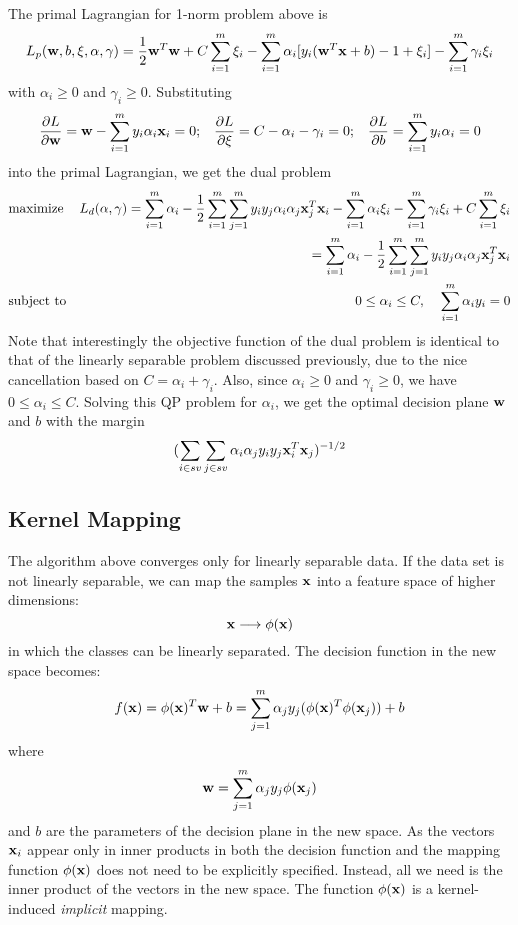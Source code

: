The primal Lagrangian for 1-norm problem above is
\[	L_p({\bf w},b,\xi,\alpha,\gamma)=\frac{1}{2}{\bf w}^T{\bf w}+C\sum_{i=1}^m\xi_i
	-\sum_{i=1}^m \alpha_i[y_i({\bf w}^T{\bf x}+b)-1+\xi_i]-\sum_{i=1}^m\gamma_i\xi_i
\]
with $\alpha_i \ge 0$ and $\gamma_i \ge 0$.
Substituting 
\[	\frac{\partial L}{\partial {\bf w}}={\bf w}-\sum_{i=1}^m y_i\alpha_i{\bf x}_i=0;
	\;\;\;
\frac{\partial L}{\partial \xi}=C-\alpha_i-\gamma_i=0;
	\;\;\;
\frac{\partial L}{\partial b}=\sum_{i=1}^m y_i\alpha_i=0	\]
into the primal Lagrangian, we get the dual problem 
\begin{eqnarray}
&	\mbox{maximize}	& L_d(\alpha,\gamma)=\sum_{i=1}^m\alpha_i
	-\frac{1}{2}\sum_{i=1}^m\sum_{j=1}^m y_iy_j\alpha_i\alpha_j {\bf x}_j^T{\bf x}_i
	-\sum_{i=1}^m \alpha_i\xi_i-\sum_{i=1}^m \gamma_i\xi_i
	+C\sum_{i=1}^m\xi_i
	\nonumber \\
&&	=\sum_{i=1}^m\alpha_i
	-\frac{1}{2}\sum_{i=1}^m\sum_{j=1}^m y_iy_j\alpha_i\alpha_j {\bf x}_j^T{\bf x}_i
	\nonumber \\
&	\mbox{subject to}	& 0 \le \alpha_i \le C,\;\;\;\;
	\sum_{i=1}^m \alpha_i y_i=0	\nonumber
\end{eqnarray}
Note that interestingly the objective function of the dual problem is
identical to that of the linearly separable problem discussed previously,
due to the nice cancellation based on $C=\alpha_i+\gamma_i$. Also, since
$\alpha_i \ge 0$ and $\gamma_i \ge 0$, we have $0 \le \alpha_i \le C$.
Solving this QP problem for $\alpha_i$, we get the optimal decision plane
${\bf w}$ and $b$ with the margin 
\[ (\sum_{i\in sv}\sum_{j\in sv} \alpha_i\alpha_jy_iy_j{\bf x}_i^T{\bf x}_j)^{-1/2} \]

\subsection*{Kernel Mapping}

The algorithm above converges only for linearly separable data. If the 
data set is not linearly separable, we can map the samples ${\bf x}$ 
into a feature space of higher dimensions:
\[
  {\bf x} \longrightarrow \phi({\bf x})	
\]
in which the classes can be linearly separated. The decision function in 
the new space becomes:
\[ 
f({\bf x})=\phi({\bf x})^T {\bf w}+b=
\sum_{j=1}^m \alpha_j y_j (\phi({\bf x})^T \phi({\bf x}_j))+b	
\]
where 
\[ {\bf w}=\sum_{j=1}^m \alpha_j y_j \phi({\bf x}_j)	\]
and $b$ are the parameters of the decision plane in the new space.
As the vectors ${\bf x}_i$ appear only in inner products in both the decision
function and the mapping function $\phi({\bf x})$ does not 
need to be explicitly specified. Instead, all we need is the inner 
product of the vectors in the new space. The function $\phi({\bf x})$ is a 
kernel-induced {\em implicit} mapping.

